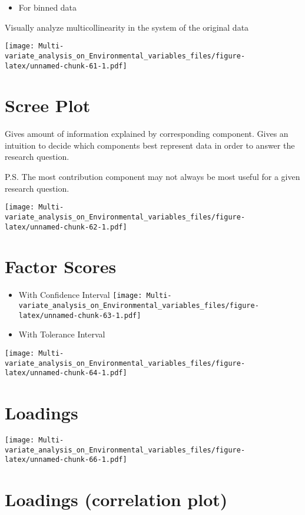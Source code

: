 \documentclass[]{book}
\providecommand{\tightlist}{%
  \setlength{\itemsep}{0pt}\setlength{\parskip}{0pt}}
\begin{document}
\begin{itemize}
\tightlist
\item
  For binned data
\end{itemize}

Visually analyze multicollinearity in the system of the original data

\texttt{[image: Multi-variate\_analysis\_on\_Environmental\_variables\_files/figure-latex/unnamed-chunk-61-1.pdf]}

\hypertarget{scree-plot-3}{%
\section{Scree Plot}\label{scree-plot-3}}

Gives amount of information explained by corresponding component. Gives
an intuition to decide which components best represent data in order to
answer the research question.

P.S. The most contribution component may not always be most useful for a
given research question.

\texttt{[image: Multi-variate\_analysis\_on\_Environmental\_variables\_files/figure-latex/unnamed-chunk-62-1.pdf]}

\hypertarget{factor-scores-3}{%
\section{Factor Scores}\label{factor-scores-3}}

\begin{itemize}
\item
  With Confidence Interval
  \texttt{[image: Multi-variate\_analysis\_on\_Environmental\_variables\_files/figure-latex/unnamed-chunk-63-1.pdf]}
\item
  With Tolerance Interval
\end{itemize}

\texttt{[image: Multi-variate\_analysis\_on\_Environmental\_variables\_files/figure-latex/unnamed-chunk-64-1.pdf]}

\hypertarget{loadings-3}{%
\section{Loadings}\label{loadings-3}}

\texttt{[image: Multi-variate\_analysis\_on\_Environmental\_variables\_files/figure-latex/unnamed-chunk-66-1.pdf]}

\hypertarget{loadings-correlation-plot-1}{%
\section{Loadings (correlation
plot)}\label{loadings-correlation-plot-1}}
\end{document}
